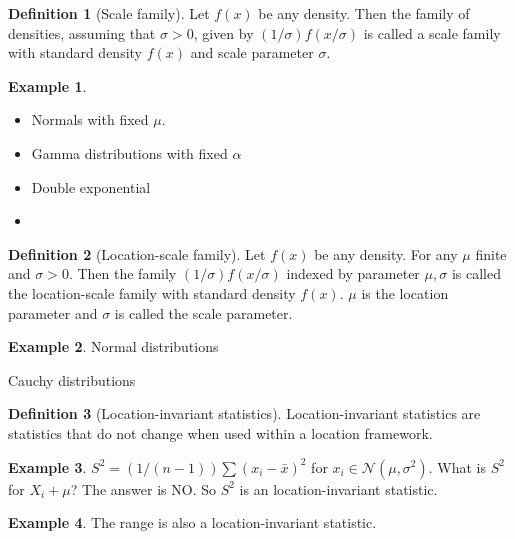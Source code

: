 \documentclass{book}
\theoremstyle{definition}
\newtheorem{defn}{Definition}[section]
\newtheorem{exmp}{Example}[section]
\newcommand{\al}{\alpha}
\newcommand{\N}{\mathcal{N}}
\begin{document}
\begin{defn}[Scale family]
	Let $f(x)$ be any density. Then the family of densities, assuming that $\sigma > 0$, given by $(1/\sigma)f(x/\sigma)$ is called a scale family with standard density $f(x)$ and scale parameter $\sigma$. 
\end{defn}


\begin{exmp}
	\begin{itemize}
		\item Normals with fixed $\mu$.
		\item Gamma distributions with fixed $\al$
		\item Double exponential
		\item 
	\end{itemize}
\end{exmp}



\begin{defn}[Location-scale family]
	Let $f(x)$ be any density. For any $\mu$ finite and $\sigma > 0$. Then the family $(1/\sigma)f(x/\sigma)$ indexed by parameter $\mu,\sigma$ is called the location-scale family with standard density $f(x)$. $\mu$ is the location parameter and $\sigma$ is called the scale parameter. 
\end{defn}



\begin{exmp}
	\item Normal distributions
	
	\item Cauchy distributions

\end{exmp}




\begin{defn}[Location-invariant statistics]
	Location-invariant statistics are statistics that do not change when used within a location  framework. 
\end{defn}

\begin{exmp}
	$S^2 = (1/(n-1))\sum(x_i - \bar{x})^2$ for $x_i \in \N(\mu,\sigma^2)$. What is $S^2$ for $X_i + \mu$? The answer is NO. So $S^2$ is an location-invariant statistic. 
\end{exmp}

\begin{exmp}
	The range is also a location-invariant statistic. 
\end{exmp}
\end{document}
